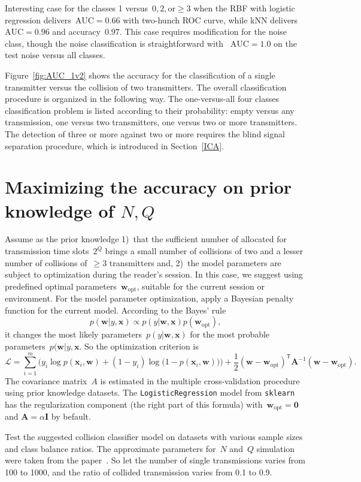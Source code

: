 \documentclass[12pt]{article}
\newcommand{\bw}{\mathbf{w}}
\newcommand{\T}{^\mathsf{T}}
\newcommand{\bx}{\mathbf{x}}
\begin{document}
Interesting case for the classes 1 versus~$0,2,\text{or}\geq3$ when the RBF with logistic regression delivers~$\text{AUC}=0.66$ with two-hunch ROC curve, while kNN delivers~$\text{AUC}=0.96$ and accuracy~$0.97$. This case requires modification for the noise class, though the noise classification is straightforward with ~$\text{AUC}=1.0$ on the test noise versus all classes.

Figure~\ref{fig:AUC_1v2} shows the accuracy for the classification of a single transmitter versus the collision of two transmitters. The overall classification procedure is organized in the following way. The one-versus-all four classes classification problem is listed according to their probability: empty versus any transmission, one versus two transmitters, one versus two or more transmitters. The detection of three or more against two or more requires the blind signal separation procedure, which is introduced in Section~\ref{ICA}.

\section{Maximizing the accuracy on prior knowledge of $N,Q$}

Assume as the prior knowledge 1)~that the sufficient number of allocated for transmission time slots~$2^Q$ brings a small number of collisions of two and a lesser number of collisions of~$\geq 3$ transmitters and, 2)~the model parameters are subject to optimization during the reader's session. In this case, we suggest using predefined optimal parameters~$\bw_\text{opt}$, suitable for the current session or environment. For the model parameter optimization, apply a Bayesian penalty function for the current model. According to the Bayes' rule
\[
p(\bw|y,\bx) \propto p(y|\bw,\bx) p({\bw}_\text{opt}),
\]
it changes the most likely parameters~$p(y|\bw,\bx)$ for the most probable parameters~$p(\bw|y,\bx$. So the optimization criterion is 
\[
\mathcal{L}= \sum_{i=1}^m \biggl( y_i \log p(\bx_i,\bw) + (1-y_i) \log\bigl(1-p(\bx_i, \bw)\bigr)\biggr)+ \frac{1}{2}(\bw-\bw_\text{opt})\T\mathbf{A}^{-1}(\bw-\bw_\text{opt}).
\]
The covariance matrix~$A$ is estimated in the multiple cross-validation procedure using prior knowledge datasets. The \texttt{LogisticRegression} model from \texttt{sklearn} has the regularization component (the right part of this formula)  with~$\bw_\text{opt}=\boldsymbol{0}$ and $\mathbf{A} = \alpha\mathbf{I}$ by befault. 

Test the suggested collision classifier model on datasets with various sample sizes and class balance ratios. 
The approximate parameters for~$N$ and~$Q$ simulation were taken from the paper~\cite{Kang2011}. So let the number of single transmissions varies from 100 to 1000, and the ratio of collided transmission varies from 0.1 to 0.9.
\end{document}
